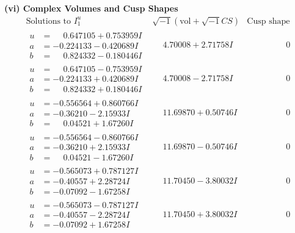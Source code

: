 \documentclass[1p]{elsarticle_modified}
\theoremstyle{definition}
\newcommand{\I}{\sqrt{-1}}
\begin{document}
\newpage\flushleft \textbf{(vi) Complex Volumes and Cusp Shapes}
$$\begin{array}{c|c|c}  
\text{Solutions to }I^u_{1}& \I (\text{vol} + \sqrt{-1}CS) & \text{Cusp shape}\\
 \hline 
\begin{aligned}
u &= \phantom{-}0.647105 + 0.753959 I \\
a &= -0.224133 - 0.420689 I \\
b &= \phantom{-}0.824332 - 0.180446 I\end{aligned}
 & \phantom{-}4.70008 + 2.71758 I & \phantom{-0.000000 } 0 \\ \hline\begin{aligned}
u &= \phantom{-}0.647105 - 0.753959 I \\
a &= -0.224133 + 0.420689 I \\
b &= \phantom{-}0.824332 + 0.180446 I\end{aligned}
 & \phantom{-}4.70008 - 2.71758 I & \phantom{-0.000000 } 0 \\ \hline\begin{aligned}
u &= -0.556564 + 0.860766 I \\
a &= -0.36210 - 2.15933 I \\
b &= \phantom{-}0.04521 + 1.67260 I\end{aligned}
 & \phantom{-}11.69870 + 0.50746 I & \phantom{-0.000000 } 0 \\ \hline\begin{aligned}
u &= -0.556564 - 0.860766 I \\
a &= -0.36210 + 2.15933 I \\
b &= \phantom{-}0.04521 - 1.67260 I\end{aligned}
 & \phantom{-}11.69870 - 0.50746 I & \phantom{-0.000000 } 0 \\ \hline\begin{aligned}
u &= -0.565073 + 0.787127 I \\
a &= -0.40557 + 2.28724 I \\
b &= -0.07092 - 1.67258 I\end{aligned}
 & \phantom{-}11.70450 - 3.80032 I & \phantom{-0.000000 } 0 \\ \hline\begin{aligned}
u &= -0.565073 - 0.787127 I \\
a &= -0.40557 - 2.28724 I \\
b &= -0.07092 + 1.67258 I\end{aligned}
 & \phantom{-}11.70450 + 3.80032 I & \phantom{-0.000000 } 0 \\ \hline\begin{aligned}

\end{aligned}
\end{array}$$
\end{document}
